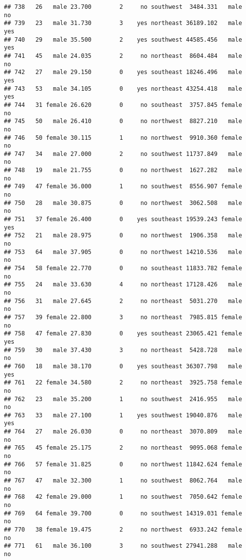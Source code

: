 \documentclass[
]{article}
\begin{document}
\begin{verbatim}
## 738   26   male 23.700        2     no southwest  3484.331   male       no
## 739   23   male 31.730        3    yes northeast 36189.102   male      yes
## 740   29   male 35.500        2    yes southwest 44585.456   male      yes
## 741   45   male 24.035        2     no northeast  8604.484   male       no
## 742   27   male 29.150        0    yes southeast 18246.496   male      yes
## 743   53   male 34.105        0    yes northeast 43254.418   male      yes
## 744   31 female 26.620        0     no southeast  3757.845 female       no
## 745   50   male 26.410        0     no northwest  8827.210   male       no
## 746   50 female 30.115        1     no northwest  9910.360 female       no
## 747   34   male 27.000        2     no southwest 11737.849   male       no
## 748   19   male 21.755        0     no northwest  1627.282   male       no
## 749   47 female 36.000        1     no southwest  8556.907 female       no
## 750   28   male 30.875        0     no northwest  3062.508   male       no
## 751   37 female 26.400        0    yes southeast 19539.243 female      yes
## 752   21   male 28.975        0     no northwest  1906.358   male       no
## 753   64   male 37.905        0     no northwest 14210.536   male       no
## 754   58 female 22.770        0     no southeast 11833.782 female       no
## 755   24   male 33.630        4     no northeast 17128.426   male       no
## 756   31   male 27.645        2     no northeast  5031.270   male       no
## 757   39 female 22.800        3     no northeast  7985.815 female       no
## 758   47 female 27.830        0    yes southeast 23065.421 female      yes
## 759   30   male 37.430        3     no northeast  5428.728   male       no
## 760   18   male 38.170        0    yes southeast 36307.798   male      yes
## 761   22 female 34.580        2     no northeast  3925.758 female       no
## 762   23   male 35.200        1     no southwest  2416.955   male       no
## 763   33   male 27.100        1    yes southwest 19040.876   male      yes
## 764   27   male 26.030        0     no northeast  3070.809   male       no
## 765   45 female 25.175        2     no northeast  9095.068 female       no
## 766   57 female 31.825        0     no northwest 11842.624 female       no
## 767   47   male 32.300        1     no southwest  8062.764   male       no
## 768   42 female 29.000        1     no southwest  7050.642 female       no
## 769   64 female 39.700        0     no southwest 14319.031 female       no
## 770   38 female 19.475        2     no northwest  6933.242 female       no
## 771   61   male 36.100        3     no southwest 27941.288   male       no

\end{verbatim}
\end{document}
